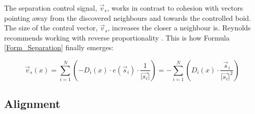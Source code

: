 \documentclass[a4paper, 10pt, journal]{wissarbIEEE}      %
\newcommand{\length}[1]{\lvert \vec{#1} \rvert}
\begin{document}


The separation control signal,  $\vec{v}_s$, works in contrast to cohesion with vectors pointing away from the discovered neighbours and towards the controlled boid. The size of the control vector,  $\vec{v}_s$, increases the closer a neighbour is. Reynolds recommends working with reverse proportionality \cite{Reynolds99steeringbehaviors}. This is how Formula \ref{Form_Separation} finally emerges:

\begin{equation}
\vec{v}_s(x) = \sum_{i=1}^N (-D_i(x) \cdot e(\vec{s}_i) \cdot \frac{1}{\length{s_i}}) = - \sum_{i=1}^N(D_i(x) \cdot \frac{\vec{s}_i}{\length{s_i}^2})
\label{Form_Separation}
\end{equation}


\subsection{Alignment}
\label{subsec_Ausrichtung}
\end{document}
